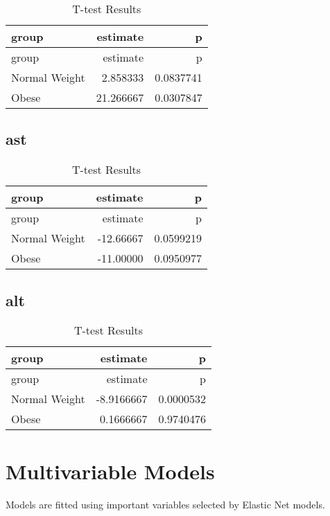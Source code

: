 \documentclass[
]{article}
\begin{document}
\begin{longtable}[]{@{}lrr@{}}
\caption{T-test Results}\tabularnewline
\toprule()
group & estimate & p \\
\midrule()
\endfirsthead
\toprule()
group & estimate & p \\
\midrule()
\endhead
Normal Weight & 2.858333 & 0.0837741 \\
Obese & 21.266667 & 0.0307847 \\
\bottomrule()
\end{longtable}

\hypertarget{ast-2}{%
\subsection{ast}\label{ast-2}}

\begin{longtable}[]{@{}lrr@{}}
\caption{T-test Results}\tabularnewline
\toprule()
group & estimate & p \\
\midrule()
\endfirsthead
\toprule()
group & estimate & p \\
\midrule()
\endhead
Normal Weight & -12.66667 & 0.0599219 \\
Obese & -11.00000 & 0.0950977 \\
\bottomrule()
\end{longtable}

\hypertarget{alt-2}{%
\subsection{alt}\label{alt-2}}

\begin{longtable}[]{@{}lrr@{}}
\caption{T-test Results}\tabularnewline
\toprule()
group & estimate & p \\
\midrule()
\endfirsthead
\toprule()
group & estimate & p \\
\midrule()
\endhead
Normal Weight & -8.9166667 & 0.0000532 \\
Obese & 0.1666667 & 0.9740476 \\
\bottomrule()
\end{longtable}

\hypertarget{multivariable-models}{%
\section{Multivariable Models}\label{multivariable-models}}

Models are fitted using important variables selected by Elastic Net
models.
\end{document}

